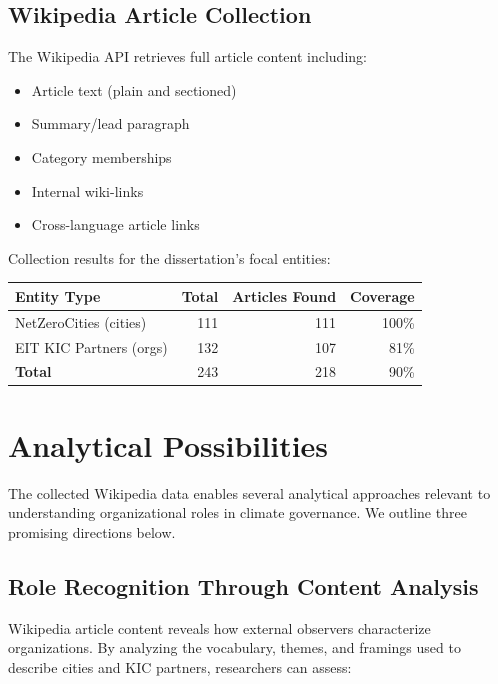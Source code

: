 \subsection{Wikipedia Article Collection}

The Wikipedia API retrieves full article content including:

\begin{itemize}
    \item Article text (plain and sectioned)
    \item Summary/lead paragraph
    \item Category memberships
    \item Internal wiki-links
    \item Cross-language article links
\end{itemize}

Collection results for the dissertation's focal entities:

\begin{center}
\begin{tabular}{lrrr}
\toprule
\textbf{Entity Type} & \textbf{Total} & \textbf{Articles Found} & \textbf{Coverage} \\
\midrule
NetZeroCities (cities) & 111 & 111 & 100\% \\
EIT KIC Partners (orgs) & 132 & 107 & 81\% \\
\midrule
\textbf{Total} & 243 & 218 & 90\% \\
\bottomrule
\end{tabular}
\end{center}

\section{Analytical Possibilities}

The collected Wikipedia data enables several analytical approaches relevant to understanding organizational roles in climate governance. We outline three promising directions below.

\subsection{Role Recognition Through Content Analysis}

Wikipedia article content reveals how external observers characterize organizations. By analyzing the vocabulary, themes, and framings used to describe cities and KIC partners, researchers can assess:

